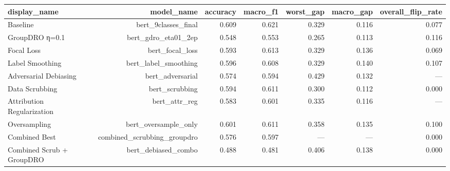 \begin{tabular}{lrrrrrr}
\toprule
\textbf{display\_name} & \textbf{model\_name} & \textbf{accuracy} & \textbf{macro\_f1} & \textbf{worst\_gap} & \textbf{macro\_gap} & \textbf{overall\_flip\_rate} \\
\midrule
Baseline & bert\_9classes\_final & 0.609 & 0.621 & 0.329 & 0.116 & 0.077 \\
GroupDRO η=0.1 & bert\_gdro\_eta01\_2ep & 0.548 & 0.553 & 0.265 & 0.113 & 0.116 \\
Focal Loss & bert\_focal\_loss & 0.593 & 0.613 & 0.329 & 0.136 & 0.069 \\
Label Smoothing & bert\_label\_smoothing & 0.596 & 0.608 & 0.329 & 0.140 & 0.107 \\
Adversarial Debiasing & bert\_adversarial & 0.574 & 0.594 & 0.429 & 0.132 & --- \\
Data Scrubbing & bert\_scrubbing & 0.594 & 0.611 & 0.300 & 0.112 & 0.000 \\
Attribution Regularization & bert\_attr\_reg & 0.583 & 0.601 & 0.335 & 0.116 & --- \\
Oversampling & bert\_oversample\_only & 0.601 & 0.611 & 0.358 & 0.135 & 0.100 \\
Combined Best & combined\_scrubbing\_groupdro & 0.576 & 0.597 & --- & --- & 0.000 \\
Combined Scrub + GroupDRO & bert\_debiased\_combo & 0.488 & 0.481 & 0.406 & 0.138 & 0.000 \\
\bottomrule
\end{tabular}
